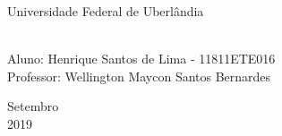 \documentclass[a4paper, 12pt]{article}
\begin{document}

\begin{titlepage}
	\begin{center}
	

		\Huge{Universidade Federal de Uberlândia}\\
	
        \textbf{\LARGE{}}\\
		\vspace{3,5cm}
	\end{center}
	
	\begin{flushleft}
		\begin{tabbing}
			Aluno: Henrique Santos de Lima - 11811ETE016\\
			Professor: Wellington Maycon Santos Bernardes\\
	\end{tabbing}
 \end{flushleft}
	\vspace{1cm}
	
	\begin{center}
		\vspace{\fill}
			 Setembro\\
		 2019
			\end{center}
\end{titlepage}

\end{document}
